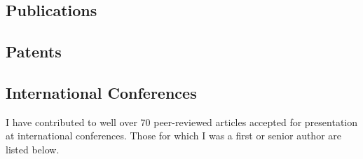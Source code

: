 \documentclass[]{mbcv}
\begin{document}
\begin{refsection}
\nocite{*}
\section{Publications}
\vspace*{10pt}
\printbibliography[heading=none]
\end{refsection}
\begin{refsection}
\nocite{*}
\section{Patents}
\vspace*{10pt}
\printbibliography[heading=none]
\end{refsection}
\begin{refsection}
\nocite{*}
\section{International Conferences}
\vspace*{10pt}
\begin{flushleft}
I have contributed to well over 70 peer-reviewed articles accepted for presentation at international conferences.  Those for which I was a first or senior author are listed below.
\end{flushleft}
\printbibliography[heading=none]
\end{refsection}
\clearpage
\restoregeometry

%
%
%
%
\end{document}
